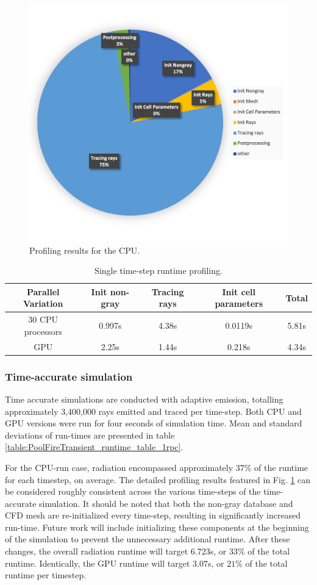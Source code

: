 \begin{figure}
\centering
\includegraphics[width=0.675\linewidth]{figures/ch4/PoolFire_profiling_OnetimestepCPU.png}
\caption{Profiling results for the CPU.}
\label{fig:PoolFire_profiling_CPU}
\end{figure}

\begin{table}[h!]
\centering
\caption{Single time-step runtime profiling.}
\begin{tabular}{c c c c c} 
 \hline
 Parallel Variation & Init non-gray & Tracing rays & Init cell parameters & Total \\ [0.5ex] 
 \hline
 30 CPU processors & 0.997s & 4.38s & 0.0119s & 5.81s \\
 GPU & 2.25s & 1.44s & 0.218s & 4.34s \\ 
 \hline
\end{tabular}
\label{table:PoolFireTimestep_runtime_table_1rpc}
\end{table}

\subsubsection{Time-accurate simulation}
Time accurate simulations are  conducted with adaptive emission, totalling approximately 3,400,000 rays emitted and traced per time-step.
Both CPU and GPU versions were run for four seconds of simulation time. Mean and standard deviations of run-times are presented in table \ref{table:PoolFireTransient_runtime_table_1rpc}. 

For the CPU-run case, radiation encompassed approximately 37\% of the runtime for each timestep, on average. The detailed profiling results featured in Fig. \ref{fig:PoolFire_profiling_CPU} can be considered roughly consistent across the various time-steps of the time-accurate simulation.
It should be noted that both the non-gray database and CFD mesh are re-initialized every time-step, resulting in significantly increased run-time. Future work will include initializing these components at the beginning of the simulation to prevent the unnecessary additional runtime.
After these changes, the overall radiation runtime will target $6.723$s, or $33$\% of the total runtime.
Identically, the GPU runtime will target $3.07$s, or $21$\% of the total runtime per timestep.

